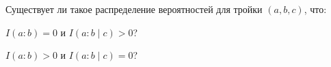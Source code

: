 Существует ли такое распределение вероятностей для тройки $(a, b, c)$, что:
\begin{enumcyr}
    \item $I(a : b) = 0$ и $I(a : b \mid c) > 0$?
    \item $I(a : b) > 0$ и $I(a : b \mid c) = 0$?
\end{enumcyr}